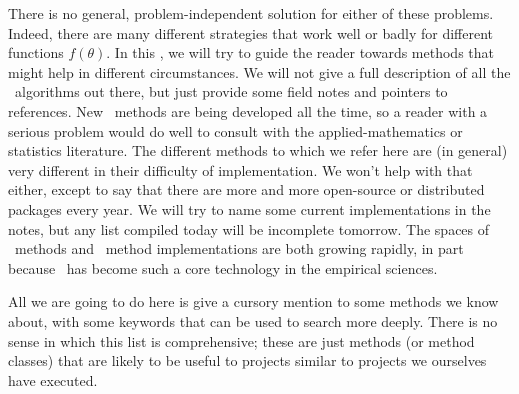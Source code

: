 \documentclass[modern]{aastex61}
\newcommand{\MCMC}{\acronym{MCMC}}
\newcommand{\pars}{\theta}
\begin{document}
There is no general, problem-independent solution for either of these
problems.
Indeed, there are many different strategies that work well or badly
for different functions $f(\pars)$.
In this \sectionname, we will try to guide the reader towards methods
that might help in different circumstances.
We will not give a full description of all the \MCMC\ algorithms out
there, but just provide some field notes and pointers to references.
New \MCMC\ methods are being developed all the time, so a reader with a
serious problem would do well to consult with the applied-mathematics
or statistics literature.
The different methods to which we refer here are (in general) very
different in their difficulty of implementation.
We won't help with that either, except to say that there are more and
more open-source or distributed packages every year.
We will try to name some current implementations in the notes, but any
list compiled today will be incomplete tomorrow.
The spaces of \MCMC\ methods and \MCMC\ method implementations are both
growing rapidly, in part because \MCMC\ has become such a core
technology in the empirical sciences.

All we are going to do here is give a cursory mention to some methods
we know about, with some keywords that can be used to search more
deeply.
There is no sense in which this list is comprehensive; these are just
methods (or method classes) that are likely to be useful to projects similar
to projects we ourselves have executed.
\end{document}
